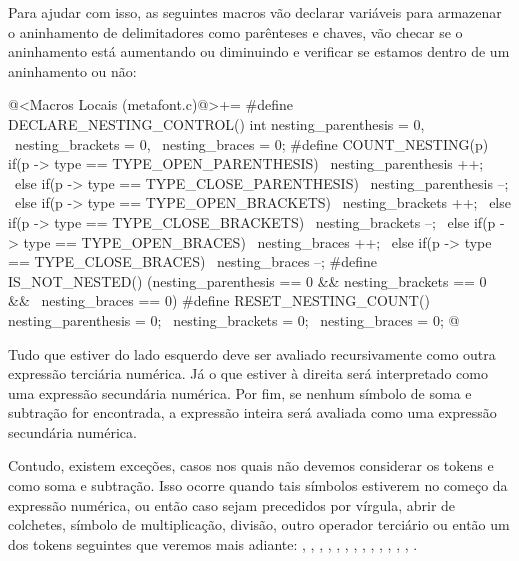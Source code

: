 Para ajudar com isso, as seguintes macros vão declarar variáveis para
armazenar o aninhamento de delimitadores como parênteses e chaves, vão
checar se o aninhamento está aumentando ou diminuindo e verificar se
estamos dentro de um aninhamento ou não:

\iniciocodigo
@<Macros Locais (metafont.c)@>+=
#define DECLARE_NESTING_CONTROL() int nesting_parenthesis = 0, \
                                      nesting_brackets = 0, \
                                      nesting_braces = 0;
#define COUNT_NESTING(p) if(p -> type == TYPE_OPEN_PARENTHESIS)           \
                               nesting_parenthesis ++;                    \
                             else if(p -> type == TYPE_CLOSE_PARENTHESIS) \
                               nesting_parenthesis --;                    \
                             else if(p -> type == TYPE_OPEN_BRACKETS)     \
                               nesting_brackets ++;                       \
                             else if(p -> type == TYPE_CLOSE_BRACKETS)    \
                               nesting_brackets --;                       \
                             else if(p -> type == TYPE_OPEN_BRACES)       \
                               nesting_braces ++;                         \
                             else if(p -> type == TYPE_CLOSE_BRACES)      \
                               nesting_braces --;
#define IS_NOT_NESTED() (nesting_parenthesis == 0 && nesting_brackets == 0 && \
                         nesting_braces == 0)
#define RESET_NESTING_COUNT() nesting_parenthesis = 0; \
                              nesting_brackets = 0; \
                              nesting_braces = 0;
@
\fimcodigo

Tudo que estiver do lado esquerdo
deve ser avaliado recursivamente como outra expressão terciária
numérica. Já o que estiver à direita será interpretado como uma
expressão secundária numérica. Por fim, se nenhum símbolo de soma e
subtração for encontrada, a expressão inteira será avaliada como uma
expressão secundária numérica.

Contudo, existem exceções, casos nos quais não devemos considerar os
tokens \monoespaco{+} e \monoespaco{-} como soma e subtração. Isso
ocorre quando tais símbolos estiverem no começo da expressão numérica,
ou então caso sejam precedidos por vírgula, abrir de colchetes,
símbolo de multiplicação, divisão, outro operador terciário ou então
um dos tokens seguintes que veremos mais
adiante: , , ,
, , ,
,  , ,
\monoespaco{shifted}, , ,
\monoespaco{yscaled}, \monoespaco{zscaled}.

